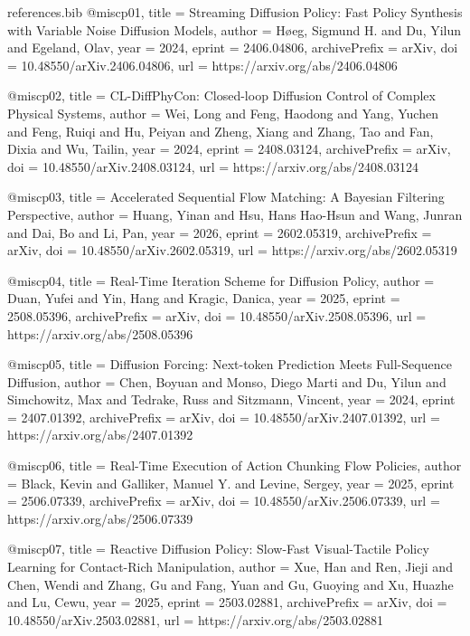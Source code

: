 \begin{filecontents*}{references.bib}
@misc{p01,
  title = {{Streaming Diffusion Policy: Fast Policy Synthesis with Variable Noise Diffusion Models}},
  author = {Høeg, Sigmund H. and Du, Yilun and Egeland, Olav},
  year = {2024},
  eprint = {2406.04806},
  archivePrefix = {arXiv},
  doi = {10.48550/arXiv.2406.04806},
  url = {https://arxiv.org/abs/2406.04806}
}

@misc{p02,
  title = {{CL-DiffPhyCon: Closed-loop Diffusion Control of Complex Physical Systems}},
  author = {Wei, Long and Feng, Haodong and Yang, Yuchen and Feng, Ruiqi and Hu, Peiyan and Zheng, Xiang and Zhang, Tao and Fan, Dixia and Wu, Tailin},
  year = {2024},
  eprint = {2408.03124},
  archivePrefix = {arXiv},
  doi = {10.48550/arXiv.2408.03124},
  url = {https://arxiv.org/abs/2408.03124}
}

@misc{p03,
  title = {{Accelerated Sequential Flow Matching: A Bayesian Filtering Perspective}},
  author = {Huang, Yinan and Hsu, Hans Hao-Hsun and Wang, Junran and Dai, Bo and Li, Pan},
  year = {2026},
  eprint = {2602.05319},
  archivePrefix = {arXiv},
  doi = {10.48550/arXiv.2602.05319},
  url = {https://arxiv.org/abs/2602.05319}
}

@misc{p04,
  title = {{Real-Time Iteration Scheme for Diffusion Policy}},
  author = {Duan, Yufei and Yin, Hang and Kragic, Danica},
  year = {2025},
  eprint = {2508.05396},
  archivePrefix = {arXiv},
  doi = {10.48550/arXiv.2508.05396},
  url = {https://arxiv.org/abs/2508.05396}
}

@misc{p05,
  title = {{Diffusion Forcing: Next-token Prediction Meets Full-Sequence Diffusion}},
  author = {Chen, Boyuan and Monso, Diego Marti and Du, Yilun and Simchowitz, Max and Tedrake, Russ and Sitzmann, Vincent},
  year = {2024},
  eprint = {2407.01392},
  archivePrefix = {arXiv},
  doi = {10.48550/arXiv.2407.01392},
  url = {https://arxiv.org/abs/2407.01392}
}

@misc{p06,
  title = {{Real-Time Execution of Action Chunking Flow Policies}},
  author = {Black, Kevin and Galliker, Manuel Y. and Levine, Sergey},
  year = {2025},
  eprint = {2506.07339},
  archivePrefix = {arXiv},
  doi = {10.48550/arXiv.2506.07339},
  url = {https://arxiv.org/abs/2506.07339}
}

@misc{p07,
  title = {{Reactive Diffusion Policy: Slow-Fast Visual-Tactile Policy Learning for Contact-Rich Manipulation}},
  author = {Xue, Han and Ren, Jieji and Chen, Wendi and Zhang, Gu and Fang, Yuan and Gu, Guoying and Xu, Huazhe and Lu, Cewu},
  year = {2025},
  eprint = {2503.02881},
  archivePrefix = {arXiv},
  doi = {10.48550/arXiv.2503.02881},
  url = {https://arxiv.org/abs/2503.02881}
}


\end{filecontents*}
